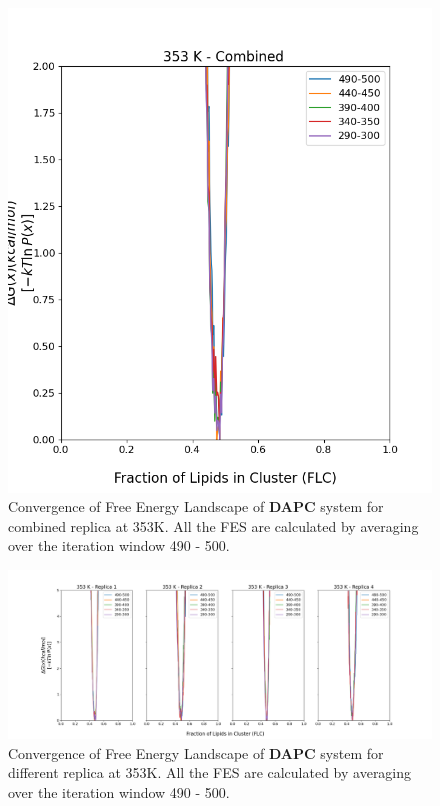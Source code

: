 \documentclass{biophys-new}
\begin{document}
\begin{figure}[hbt!]
\centering
\includegraphics[width=0.6\linewidth]{all_plots/ClusterLipids2Total/DPPC_DAPC_CHOL/353K/Convergence_DAPC_MULTI__353_ClusterLipids2Total.png}
\caption{Convergence of Free Energy Landscape of \textbf{DAPC} system for combined replica at 353K. All the FES are calculated by averaging over the iteration window 490 - 500.}
\label{fig:view}

\end{figure}

\begin{figure}[hbt!]
\centering
\includegraphics[width=1.1\linewidth]{all_plots/ClusterLipids2Total/DPPC_DAPC_CHOL/353K/Convergence_DAPC_353_ClusterLipids2Total.png}
\caption{Convergence of Free Energy Landscape of \textbf{DAPC} system for different replica at 353K. All the FES are calculated by averaging over the iteration window 490 - 500.}
\label{fig:view}

\end{figure}
\end{document}
